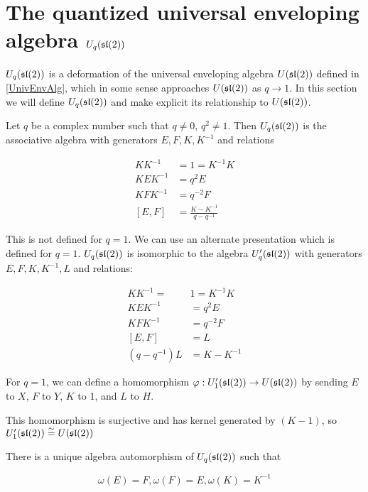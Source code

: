 \section{The quantized universal enveloping algebra $U_q(\mathfrak{sl}(2))$}

$U_q(\mathfrak{sl}(2))$ is a deformation of the universal enveloping algebra
$U(\mathfrak{sl}(2))$ defined in \ref{UnivEnvAlg}, which in some sense approaches
$U(\mathfrak{sl}(2))$ as $q \to 1$. In this section we will define $U_q(\mathfrak{sl}(2))$ and
make explicit its relationship to $U(\mathfrak{sl}(2))$.

Let $q$ be a complex number such that $q \neq 0$, $q^2 \neq 1$.  Then
$U_q(\mathfrak{sl}(2))$ is the associative algebra with generators $E,F,K, K^{-1}$ and
relations 

\begin{align}
    KK^{-1} &= 1 = K^{-1}K \\
    KEK^{-1} &= q^2 E \\
    KFK^{-1} &= q^{-2} F \\
    [E,F] &= \frac{K - K^{-1}}{q - q^{-1}}
\end{align}



This is not defined for $q = 1$. We can use an alternate presentation which is
defined for $q = 1$. $U_q(\mathfrak{sl}(2))$ is isomorphic to the algebra
$U'_q(\mathfrak{sl}(2))$ with generators $E,F,K,K^{-1},L$ and relations:

\begin{align}
    KK^{-1} =\ &1 = K^{-1}K \\
    KEK^{-1} &= q^2 E \\
    KFK^{-1} &= q^{-2} F \\
    [E,F] &= L \\
    (q - q^{-1})L &= K-K^{-1} 
\end{align}

For $q=1$, we can define a homomorphism $\varphi: U'_1(\mathfrak{sl}(2)) \to
U(\mathfrak{sl}(2))$ by sending $E$ to $X$, $F$ to $Y$, $K$ to 1, and $L$ to $H$. 
\begin{lemma}
This homomorphism is surjective and has kernel generated by $(K-1)$, so
$U'_1(\mathfrak{sl}(2)) \stackrel{\sim}{=} U(\mathfrak{sl}(2))$
\end{lemma}

There is a unique algebra automorphism of $U_q(\mathfrak{sl}(2))$ such that 

\begin{equation}
    \omega(E) = F, \omega(F) = E, \omega(K) = K^{-1}
\end{equation}

